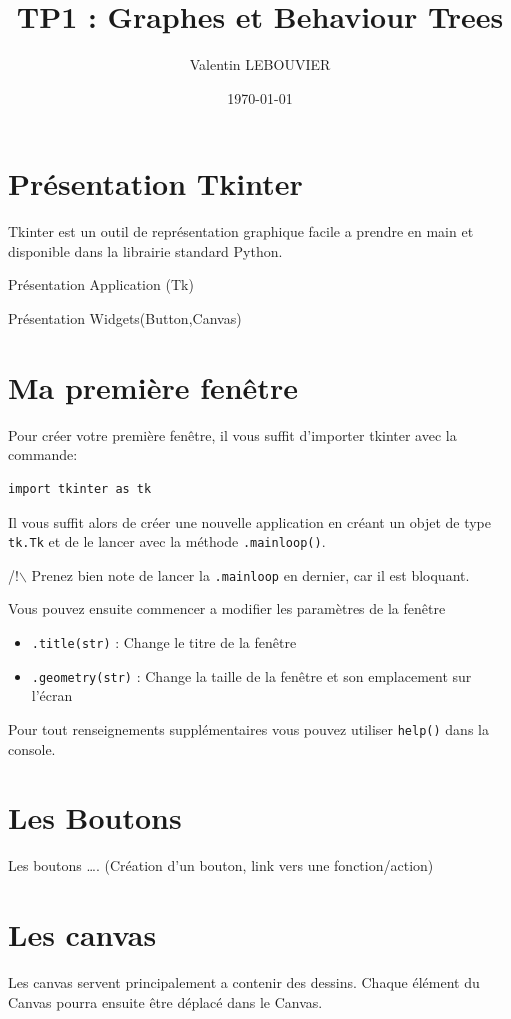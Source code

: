 \documentclass{article}
\author{Valentin LEBOUVIER}
\date{\today}
\title{TP1 : Graphes et Behaviour Trees}
\begin{document}
\maketitle


\section{Présentation Tkinter}
\label{sec-1}
Tkinter est un outil de représentation graphique facile a prendre en main et disponible dans la librairie standard Python.

Présentation Application (Tk)

Présentation Widgets(Button,Canvas)


\section{Ma première fenêtre}
\label{sec-2}
Pour créer votre première fenêtre, il vous suffit d'importer tkinter avec la commande:
\begin{verbatim}
import tkinter as tk
\end{verbatim}

Il vous suffit alors de créer une nouvelle application en créant un objet de type \verb~tk.Tk~ et de le lancer avec la méthode \verb~.mainloop()~.

\noindent
/!$\backslash$ Prenez bien note de lancer la \verb~.mainloop~ en dernier, car il est bloquant.


\noindent
Vous pouvez ensuite commencer a modifier les paramètres de la fenêtre
\begin{itemize}
\item \verb~.title(str)~ : Change le titre de la fenêtre
\item \verb~.geometry(str)~ : Change la taille de la fenêtre et son emplacement sur l'écran
\end{itemize}
\noindent
Pour tout renseignements supplémentaires vous pouvez utiliser \verb~help()~ dans la console.

\section{Les Boutons}
\label{sec-3}
Les boutons \ldots{}. (Création d'un bouton, link vers une fonction/action)

\section{Les canvas}
\label{sec-4}
Les canvas servent principalement a contenir des dessins. Chaque élément du Canvas pourra ensuite être déplacé dans le Canvas.
\end{document}
